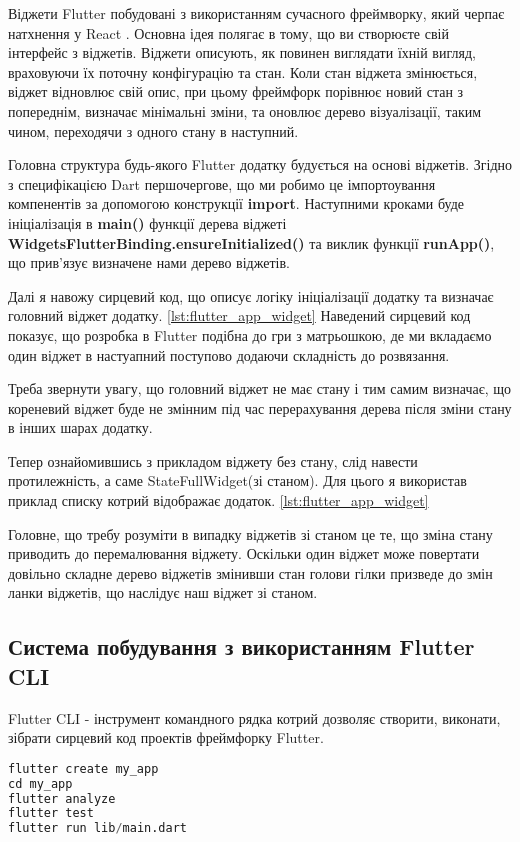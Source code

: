 Віджети Flutter побудовані з використанням сучасного фреймворку, який черпає натхнення у React \cite{flutter_widgets_intro}.
Основна ідея полягає в тому, що ви створюєте свій інтерфейс з віджетів.
Віджети описують, як повинен виглядати їхній вигляд, враховуючи їх поточну конфігурацію та стан.
Коли стан віджета змінюється, віджет відновлює свій опис, при цьому фреймфорк порівнює новий стан з попереднім,
визначає мінімальні зміни, та оновлює дерево візуалізації, таким чином, переходячи з одного стану в наступний.

Головна структура будь-якого Flutter додатку будується на основі віджетів.
Згідно з специфікацією Dart першочергове, що ми робимо це імпортоування компенентів за допомогою конструкції \textbf{import}.
Наступними кроками буде ініціалізація в \textbf{main()} функції дерева віджеті \textbf{WidgetsFlutterBinding.ensureInitialized()} та
виклик функції \textbf{runApp()}, що прив'язує визначене нами дерево віджетів.

Далі я навожу сирцевий код, що описує логіку ініціалізації додатку та визначає головний віджет додатку. \ref{lst:flutter_app_widget}
Наведений сирцевий код показує, що розробка в Flutter подібна до гри з матрьошкою,
де ми вкладаємо один віджет в настуапний поступово додаючи складність до розвязання.

Треба звернути увагу, що головний віджет не має стану і тим самим визначає, що кореневий віджет буде не змінним
під час перерахування дерева після зміни стану в інших шарах додатку.

Тепер ознайомившись з прикладом віджету без стану, слід навести протилежність, а саме StateFullWidget(зі станом).
Для цього я використав приклад списку котрий відображає додаток. \ref{lst:flutter_app_widget}

Головне, що требу розуміти в випадку віджетів зі станом це те, що зміна стану приводить до перемалювання віджету.
Оскільки один віджет може повертати довільно складне дерево віджетів змінивши стан голови гілки призведе до змін
ланки віджетів, що наслідує наш віджет зі станом.

\subsection{Система побудування з використанням Flutter CLI}
\label{subsec:flutter_cli_theory}
Flutter CLI - інструмент командного рядка котрий дозволяє створити, виконати, зібрати сирцевий код проектів фреймфорку Flutter.

\begin{lstlisting}[style=light, language=Python,label={lst:flutter_cli_create},caption=Flutter Create Project]
flutter create my_app
cd my_app
flutter analyze
flutter test
flutter run lib/main.dart
\end{lstlisting}

